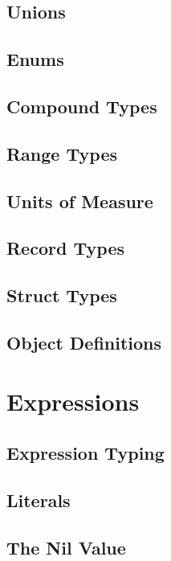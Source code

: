 \section{Unions}

\section{Enums}

\section{Compound Types}

\section{Range Types}

\section{Units of Measure}

\section{Record Types}

\section{Struct Types}

\section{Object Definitions}

\chapter{Expressions}

\section{Expression Typing}

\section{Literals}

\section{The Nil Value}


